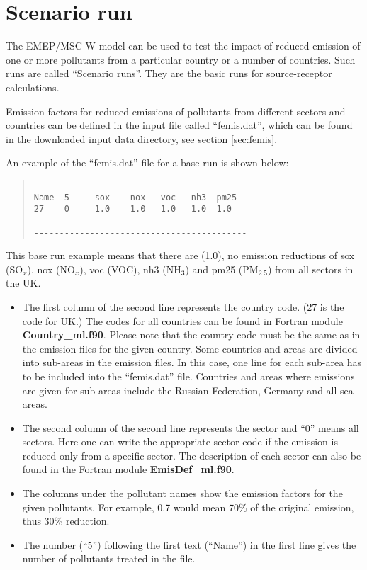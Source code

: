 \section{Scenario run}
\label{sec:scenrun}

The EMEP/MSC-W model can be used to test the impact of reduced emission of
one or more pollutants from a particular country or a number of
countries.  Such runs are called ``Scenario runs''. They are the basic
runs for source-receptor calculations.

Emission factors for reduced emissions of pollutants from different
sectors and countries can be defined in the input file called
``femis.dat'', which can be found in the downloaded input data
directory, see section \ref{sec:femis}.

An example of the ``femis.dat'' file for a base run is shown below:
\begin{quote}

\begin{verbatim}
------------------------------------------
Name  5     sox    nox   voc   nh3  pm25
27    0     1.0    1.0   1.0   1.0  1.0  

------------------------------------------
\end{verbatim}
\end{quote}
\noindent
This base run example means that there are (1.0), no emission reductions of 
sox (SO$_x$), nox (NO$_x$), voc (VOC), nh3 (NH$_3$) and pm25 (PM$_{2.5}$) from 
all sectors in the UK. 

\begin{itemize}

\item The first column of
the second line represents the country code. (27 is the code for UK.)
The codes for all countries can be found in  Fortran module {\bf
  Country\_ml.f90}. Please note that the country code must be the same
as in the emission files for the given country. Some
countries and areas are divided into sub-areas in the emission
files. In this case, one line for each sub-area has to be included
into the ``femis.dat'' file. Countries and areas where emissions are
given for sub-areas include the Russian Federation, Germany and all 
sea areas.    

\item The second
column of the second line 
represents the sector and ``0'' means all sectors. Here one can write
the appropriate sector code if the emission is reduced only from a specific
sector. The description of each sector can also be found in the Fortran
module {\bf EmisDef\_ml.f90}. 

\item The columns under the pollutant names show the emission factors
  for the given pollutants. For example, 0.7 would mean 70\% of the
  original emission, thus 30\% reduction.

\item The number (``5'') following
the first text (``Name'') in the first line gives the number of
pollutants treated in the file.   
              
\end{itemize}


